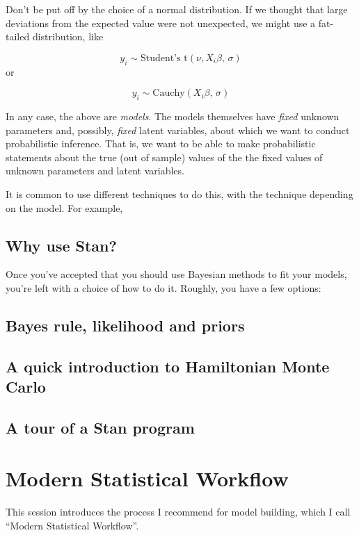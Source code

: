 \documentclass[]{book}
\begin{document}
Don't be put off by the choice of a normal distribution. If we thought
that large deviations from the expected value were not unexpected, we
might use a fat-tailed distribution, like

\[
y_{i}  \sim \mbox{Student's t}(\nu, X_{i}\beta ,\, \sigma)
\] or

\[
y_{i}  \sim \mbox{Cauchy}(X_{i}\beta ,\, \sigma)
\]

In any case, the above are \emph{models}. The models themselves have
\emph{fixed} unknown parameters and, possibly, \emph{fixed} latent
variables, about which we want to conduct probabilistic inference. That
is, we want to be able to make probabilistic statements about the true
(out of sample) values of the the fixed values of unknown parameters and
latent variables.

It is common to use different techniques to do this, with the technique
depending on the model. For example,

\section{Why use Stan?}\label{why-use-stan}

Once you've accepted that you should use Bayesian methods to fit your
models, you're left with a choice of how to do it. Roughly, you have a
few options:

\section{Bayes rule, likelihood and
priors}\label{bayes-rule-likelihood-and-priors}

\section{A quick introduction to Hamiltonian Monte
Carlo}\label{a-quick-introduction-to-hamiltonian-monte-carlo}

\section{A tour of a Stan program}\label{a-tour-of-a-stan-program}

\chapter{Modern Statistical Workflow}\label{msw}

This session introduces the process I recommend for model building,
which I call ``Modern Statistical Workflow''.
\end{document}
